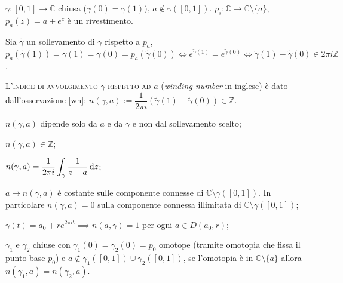 \begin{oss} \label{wn}
  $\gamma:[0, 1] \rightarrow \mathbb{C}$ chiusa ($\gamma(0)=\gamma(1))$, $a \not\in \gamma([0, 1])$. $p_s: \mathbb{C} \rightarrow \mathbb{C} \setminus \{a\}$, $p_a(z)=a+e^z$ è un rivestimento.
  \begin{center}
  \end{center}
  Sia $\tilde{\gamma}$ un sollevamento di $\gamma$ rispetto a $p_a$, $p_a(\tilde{\gamma}(1))=\gamma(1)=\gamma(0)=p_a(\tilde{\gamma}(0)) \iff e^{\tilde{\gamma}(1)}=e^{\tilde{\gamma}(0)} \iff \tilde{\gamma}(1)-\tilde{\gamma}(0) \in 2\pi i \mathbb{Z}$.
\end{oss}

\begin{defn}
  L'\textsc{indice di avvolgimento $\gamma$ rispetto ad $a$} (\textit{winding number} in inglese) è dato dall'osservazione \ref{wn}: $n(\gamma, a):=\dfrac{1}{2\pi i}(\tilde{\gamma}(1)-\tilde{\gamma}(0)) \in \mathbb{Z}$.
\end{defn}

\begin{thm}
  \begin{nlist}
    \item $n(\gamma, a)$ dipende solo da $a$ e da $\gamma$ e non dal sollevamento scelto;
    \item $n(\gamma, a) \in \mathbb{Z}$;
    \item $\displaystyle n(\gamma, a)=\frac{1}{2\pi i}\int_{\gamma} \frac{1}{z-a} \mathop{}\!\mathrm{d} z$;
    \item $a \mapsto n(\gamma, a)$ è costante sulle componente connesse di $\mathbb{C} \setminus \gamma([0, 1])$. In particolare $n(\gamma, a)=0$ sulla componente connessa illimitata di $\mathbb{C} \setminus \gamma([0, 1])$;
    \item $\gamma(t)=a_0+re^{2\pi i t} \implies n(a, \gamma)=1$ per ogni $a \in D(a_0, r)$;
    \item $\gamma_1$ e $\gamma_2$ chiuse con $\gamma_1(0)=\gamma_2(0)=p_0$ omotope (tramite omotopia che fissa il punto base $p_0$) e $a \not\in \gamma_1([0, 1]) \cup \gamma_2([0, 1])$, se l'omotopia è in $\mathbb{C} \setminus \{a\}$ allora $n(\gamma_1, a)=n(\gamma_2, a)$.
  \end{nlist}
\end{thm}

